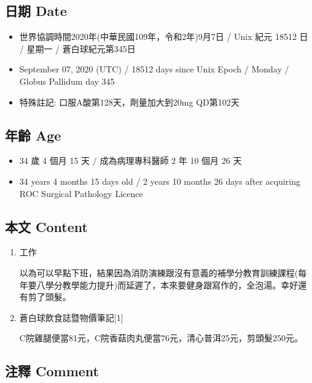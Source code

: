 \documentclass[
]{article}
\providecommand{\tightlist}{%
  \setlength{\itemsep}{0pt}\setlength{\parskip}{0pt}}
\begin{document}
\hypertarget{ux65e5ux671f-date-6}{%
\subsection{日期 Date}\label{ux65e5ux671f-date-6}}

\begin{itemize}
\tightlist
\item
  世界協調時間2020年(中華民國109年，令和2年)9月7日 / Unix 紀元 18512 日
  / 星期一 / 蒼白球紀元第345日
\item
  September 07, 2020 (UTC) / 18512 days since Unix Epoch / Monday /
  Globus Pallidum day 345
\item
  特殊註記: 口服A酸第128天，劑量加大到20mg QD第102天
\end{itemize}

\hypertarget{ux5e74ux9f61-age-6}{%
\subsection{年齡 Age}\label{ux5e74ux9f61-age-6}}

\begin{itemize}
\tightlist
\item
  34 歲 4 個月 15 天 / 成為病理專科醫師 2 年 10 個月 26 天
\item
  34 years 4 months 15 days old / 2 years 10 months 26 days after
  acquiring ROC Surgical Pathology Licence
\end{itemize}

\hypertarget{ux672cux6587-content-6}{%
\subsection{本文 Content}\label{ux672cux6587-content-6}}

\begin{enumerate}
\def\labelenumi{\arabic{enumi}.}
\item
  工作

  以為可以早點下班，結果因為消防演練跟沒有意義的補學分教育訓練課程(每年要八學分教學能力提升)而延遲了，本來要健身跟寫作的，全泡湯。幸好還有剪了頭髮。
\item
  蒼白球飲食誌暨物價筆記{[}1{]}

  C院雞腿便當81元，C院香菇肉丸便當76元，清心普洱25元，剪頭髮250元。
\end{enumerate}

\hypertarget{ux6ce8ux91cb-comment-6}{%
\subsection{注釋 Comment}\label{ux6ce8ux91cb-comment-6}}
\end{document}
